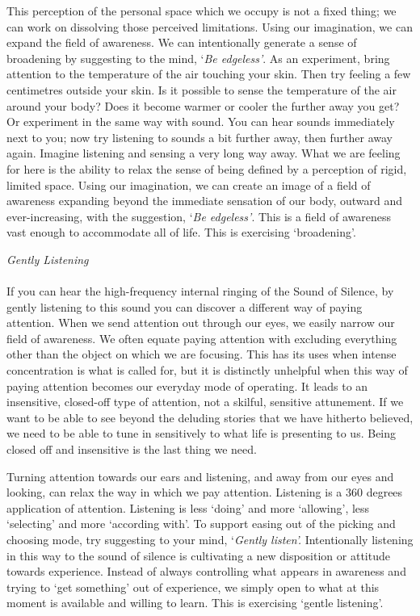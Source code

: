 This perception of the personal space which we occupy is not a fixed
thing; we can work on dissolving those perceived limitations. Using our
imagination, we can expand the field of awareness. We can intentionally
generate a sense of broadening by suggesting to the mind, `\emph{Be
edgeless'}. As an experiment, bring attention to the temperature of the
air touching your skin. Then try feeling a few centimetres outside your
skin. Is it possible to sense the temperature of the air around your
body? Does it become warmer or cooler the further away you get? Or
experiment in the same way with sound. You can hear sounds immediately
next to you; now try listening to sounds a bit further away, then
further away again. Imagine listening and sensing a very long way away.
What we are feeling for here is the ability to relax the sense of being
defined by a perception of rigid, limited space. Using our imagination,
we can create an image of a field of awareness expanding beyond the
immediate sensation of our body, outward and ever-increasing, with the
suggestion, `\emph{Be edgeless'}. This is a field of awareness vast
enough to accommodate all of life. This is exercising `broadening'.

\emph{Gently Listening\\
~\\
}If you can hear the high-frequency internal ringing of the Sound of
Silence, by gently listening to this sound you can discover a different
way of paying attention. When we send attention out through our eyes, we
easily narrow our field of awareness. We often equate paying attention
with excluding everything other than the object on which we are
focusing. This has its uses when intense concentration is what is called
for, but it is distinctly unhelpful when this way of paying attention
becomes our everyday mode of operating. It leads to an insensitive,
closed-off type of attention, not a skilful, sensitive attunement. If we
want to be able to see beyond the deluding stories that we have hitherto
believed, we need to be able to tune in sensitively to what life is
presenting to us. Being closed off and insensitive is the last thing we
need.

Turning attention towards our ears and listening, and away from our eyes
and looking, can relax the way in which we pay attention. Listening is a
360 degrees application of attention. Listening is less `doing' and more
`allowing', less `selecting' and more `according with'. To support
easing out of the picking and choosing mode, try suggesting to your
mind, `\emph{Gently listen'.} Intentionally listening in this way to the
sound of silence is cultivating a new disposition or attitude towards
experience. Instead of always controlling what appears in awareness and
trying to `get something' out of experience, we simply open to what at
this moment is available and willing to learn. This is exercising
`gentle listening'.

